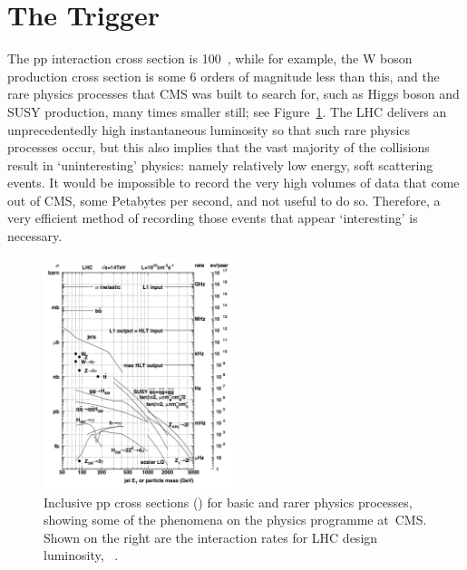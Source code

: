 

\newpage
\section{The Trigger} \label{sec:CMStrig}

The pp interaction cross section is 100~\mb, while for example, the W boson production cross section is some 6 orders of magnitude less than this, and the rare physics processes that \ac{CMS} was built to search for, such as Higgs boson and \ac{SUSY} production, many times smaller still; see Figure~\ref{fig:ppCrossSec}.
The \ac{LHC} delivers an unprecedentedly high instantaneous luminosity so that such rare physics processes occur, but this also implies that the vast majority of the collisions result in `uninteresting' physics: namely relatively low energy, soft scattering events.
It would be impossible to record the very high volumes of data that come out of \ac{CMS}, some Petabytes per second, and not useful to do so.
Therefore, a very efficient method of recording those events that appear `interesting'
is necessary.%

\begin{figure}[htbp]
  \begin{center}
  \includegraphics[width=0.49\textwidth]{Figures/detector/ppCrossSections}
  \caption{Inclusive pp cross sections (\sigma) for basic and rarer physics processes, showing some of the phenomena on the physics programme at~\ac{CMS}. Shown on the right are the interaction rates for \ac{LHC} design luminosity, \designLumi~\cite{Cittolin:578006}.
}
  \label{fig:ppCrossSec}
  \end{center}
\end{figure}

